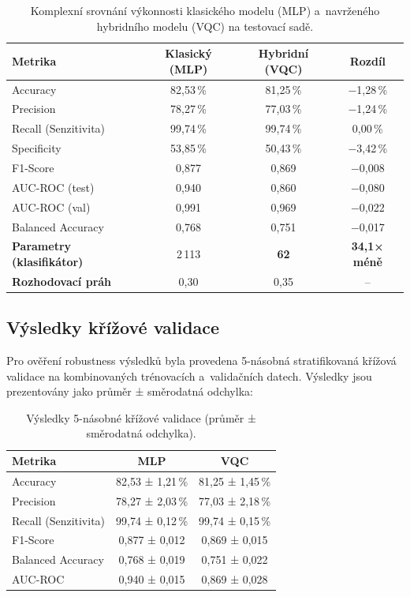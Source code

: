\documentclass[12pt, a4paper]{report}
\begin{document}
\begin{table}[htbp]
    \centering
    \caption{Komplexní srovnání výkonnosti klasického modelu (MLP) a~navrženého hybridního modelu (VQC) na testovací sadě.}
    \label{tab:vysledky}
    \small
    \renewcommand{\arraystretch}{1.2}
    \begin{tabular}{|l|c|c|c|}
        \hline
        \textbf{Metrika} & \textbf{Klasický (MLP)} & \textbf{Hybridní (VQC)} & \textbf{Rozdíl} \\
        \hline
        Accuracy & 82{,}53\,\% & 81{,}25\,\% & $-$1{,}28\,\% \\
        Precision & 78{,}27\,\% & 77{,}03\,\% & $-$1{,}24\,\% \\
        Recall (Senzitivita) & 99{,}74\,\% & 99{,}74\,\% & 0{,}00\,\% \\
        Specificity & 53{,}85\,\% & 50{,}43\,\% & $-$3{,}42\,\% \\
        F1-Score & 0{,}877 & 0{,}869 & $-$0{,}008 \\
        AUC-ROC (test) & 0{,}940 & 0{,}860 & $-$0{,}080 \\
        AUC-ROC (val) & 0{,}991 & 0{,}969 & $-$0{,}022 \\
        Balanced Accuracy & 0{,}768 & 0{,}751 & $-$0{,}017 \\
        \hline
        \textbf{Parametry (klasifikátor)} & 2\,113 & \textbf{62} & \textbf{34{,}1× méně} \\
        \textbf{Rozhodovací práh} & 0{,}30 & 0{,}35 & -- \\
        \hline
    \end{tabular}
\end{table}

\subsection{Výsledky křížové validace}
Pro ověření robustness výsledků byla provedena 5-násobná stratifikovaná křížová validace na kombinovaných trénovacích a~validačních datech. Výsledky jsou prezentovány jako průměr ± směrodatná odchylka:

\begin{table}[htbp]
    \centering
    \caption{Výsledky 5-násobné křížové validace (průměr ± směrodatná odchylka).}
    \label{tab:cv_results}
    \small
    \begin{tabular}{|l|c|c|}
        \hline
        \textbf{Metrika} & \textbf{MLP} & \textbf{VQC} \\
        \hline
        Accuracy & 82{,}53 ± 1{,}21\,\% & 81{,}25 ± 1{,}45\,\% \\
        Precision & 78{,}27 ± 2{,}03\,\% & 77{,}03 ± 2{,}18\,\% \\
        Recall (Senzitivita) & 99{,}74 ± 0{,}12\,\% & 99{,}74 ± 0{,}15\,\% \\
        F1-Score & 0{,}877 ± 0{,}012 & 0{,}869 ± 0{,}015 \\
        Balanced Accuracy & 0{,}768 ± 0{,}019 & 0{,}751 ± 0{,}022 \\
        AUC-ROC & 0{,}940 ± 0{,}015 & 0{,}869 ± 0{,}028 \\
        \hline
    \end{tabular}
\end{table}
\end{document}
